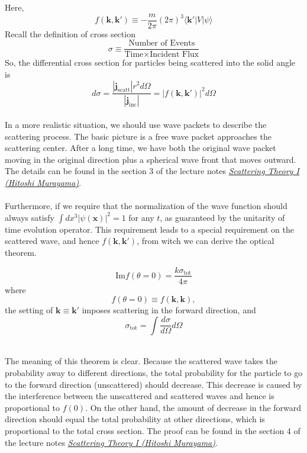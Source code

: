 Here,
\[f(\bm{k},\bm{k}') \equiv - \frac{m}{2\pi} (2\pi)^3  \langle \bm{k}'| V | \psi\rangle \]
Recall the definition of cross section
\[\sigma \equiv \frac{\mbox{Number of Events}}{\mbox{Time} \times \mbox{Incident Flux}}\]
So, the differential cross section for particles being scattered into the solid angle is
\[d\sigma = \frac{|\bm{j}_{\mathrm{scatt}}| r^2 d\Omega}{|\bm{j}_{\mathrm{inc}}|} = |f(\bm{k},\bm{k}')|^2 d\Omega\]
\\
In a more realistic situation, we should use wave packets to describe the scattering process. The basic picture is a free wave packet approaches the scattering center. After a long time, we have both the original wave packet moving in the original direction plus a spherical wave front that moves outward. The details can be found in the section 3 of the lecture notes 
\href{http://hitoshi.berkeley.edu/221B/index.html}{\emph{Scattering Theory I (Hitoshi Murayama)}}.
\\ \\
Furthermore, if we require that the normalization of the wave function should always satisfy $\int dx^3 |\psi(\bm{x})|^2 = 1$ for any $t$, as guaranteed by the unitarity of time evolution operator. This requirement leads to a special requirement on the scattered wave, and hence $f(\bm{k},\bm{k}')$, from witch we can derive the optical theorem.\\

\begin{newthem}
\[\mathrm{Im} f(\theta = 0) = \frac{k\sigma_{\mathrm{tot}}}{4\pi}\]
where
\[f(\theta = 0) \equiv f(\bm{k},\bm{k}),\]
the setting of $\bm{k} \equiv \bm{k}'$ imposes scattering in the forward direction, and
\[\sigma_{\mathrm{tot}} = \int \frac{d\sigma}{d\Omega} d\Omega\]
\end{newthem}
\noindent
\\
The meaning of this theorem is clear. Because the scattered wave takes the probability away to different directions, the total probability for the particle to go to the forward direction (unscattered) should decrease. This decrease is caused by the interference between the unscattered and scattered waves and hence is proportional to $f(0)$. On the other hand, the amount of decrease in the forward direction should equal the total probability at other directions, which is proportional to the total cross section. The proof can be found in the section 4 of the lecture notes \href{http://hitoshi.berkeley.edu/221B/index.html}{\emph{Scattering Theory I (Hitoshi Murayama)}}.

